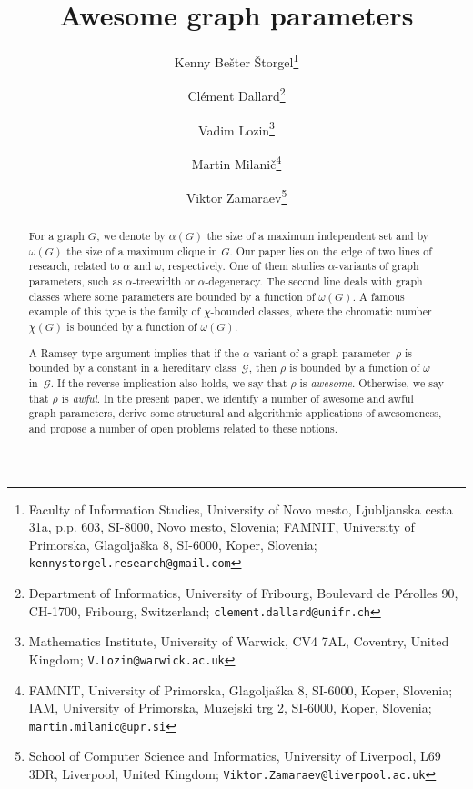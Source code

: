 \documentclass[11pt]{article}
\theoremstyle{plain}
\theoremstyle{definition}
\theoremstyle{remark}
\numberwithin{equation}{section}
\begin{document}
\title{Awesome graph parameters}

\author{
Kenny Bešter Štorgel\thanks{Faculty of Information Studies, University of Novo mesto, Ljubljanska cesta 31a, p.p. 603, SI-8000, Novo mesto, Slovenia; FAMNIT, University of Primorska, Glagoljaška 8, SI-6000, Koper, Slovenia; \texttt{kennystorgel.research@gmail.com}}
\and
Clément Dallard\thanks{Department of Informatics, University of Fribourg, Boulevard de Pérolles 90, CH-1700, Fribourg, Switzerland; \texttt{clement.dallard@unifr.ch}}
\and
Vadim Lozin\thanks{Mathematics Institute, University of Warwick, CV4 7AL, Coventry, United Kingdom; \texttt{V.Lozin@warwick.ac.uk}}
\and
Martin Milanič\thanks{FAMNIT, University of Primorska, Glagoljaška 8, SI-6000, Koper, Slovenia; IAM, University of Primorska, Muzejski trg 2, SI-6000, Koper, Slovenia; \texttt{martin.milanic@upr.si}}
\and
Viktor Zamaraev\thanks{School of Computer Science and Informatics, University of Liverpool, L69 3DR, Liverpool, United Kingdom; \texttt{Viktor.Zamaraev@liverpool.ac.uk}}
}

\date{}
\maketitle

\begin{abstract}
For a graph $G$, we denote by $\alpha(G)$ the size of a maximum independent set and by $\omega(G)$ the size of a maximum clique in $G$. 
Our paper lies on the edge of two lines of research, related to $\alpha$ and $\omega$, respectively. 
One of them studies $\alpha$-variants of graph parameters, such as $\alpha$-treewidth or $\alpha$-degeneracy. 
The second line deals with graph classes where some parameters are bounded by a function of $\omega(G)$. 
A famous example of this type is the family of $\chi$-bounded classes, where the chromatic number $\chi(G)$ is bounded by a function of $\omega(G)$.

A Ramsey-type argument implies that if the $\alpha$-variant of a graph parameter~$\rho$ is bounded by a constant in a hereditary class~$\mathcal{G}$, then $\rho$ is bounded by a function of $\omega$ in~$\mathcal{G}$. 
If the reverse implication also holds, we say that $\rho$ is \emph{awesome}.
Otherwise, we say that $\rho$ is \emph{awful}.
In the present paper, we identify a number of awesome and awful graph parameters, derive some structural and algorithmic applications of awesomeness, and propose a number of open problems related to these notions.
\end{abstract}
\end{document}
